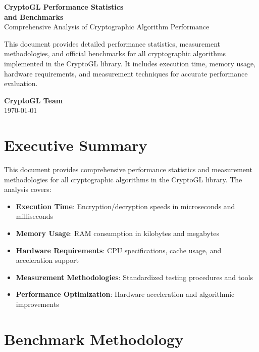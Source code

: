 \documentclass[12pt,a4paper]{article}
\begin{document}
\begin{titlepage}
\centering
\vspace*{2cm}
{\Huge\bfseries\color{primary} CryptoGL Performance Statistics\\ and Benchmarks}\\[1cm]
{\Large\color{secondary} Comprehensive Analysis of Cryptographic Algorithm Performance}\\[2cm]

\begin{minipage}{0.8\textwidth}
\centering
\large
This document provides detailed performance statistics, measurement methodologies, and official benchmarks for all cryptographic algorithms implemented in the CryptoGL library. It includes execution time, memory usage, hardware requirements, and measurement techniques for accurate performance evaluation.
\end{minipage}

\vfill
{\large\bfseries\color{primary} CryptoGL Team}\\[0.5cm]
{\large \today}
\end{titlepage}

\tableofcontents
\newpage

\section{Executive Summary}

This document provides comprehensive performance statistics and measurement methodologies for all cryptographic algorithms in the CryptoGL library. The analysis covers:

\begin{itemize}
    \item \textbf{Execution Time}: Encryption/decryption speeds in microseconds and milliseconds
    \item \textbf{Memory Usage}: RAM consumption in kilobytes and megabytes
    \item \textbf{Hardware Requirements}: CPU specifications, cache usage, and acceleration support
    \item \textbf{Measurement Methodologies}: Standardized testing procedures and tools
    \item \textbf{Performance Optimization}: Hardware acceleration and algorithmic improvements
\end{itemize}

\section{Benchmark Methodology}
\end{document}
